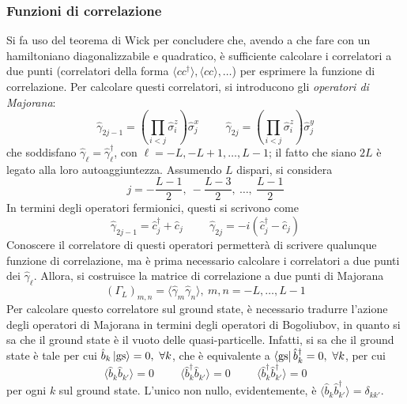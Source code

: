 \documentclass[11pt, a4paper]{scrartcl}
\theoremstyle{style}
\theoremstyle{style1}
\numberwithin{equation}{subsection}
\begin{document}
\subsubsection{Funzioni di correlazione}
Si fa uso del teorema di Wick per concludere che, avendo a che fare con un hamiltoniano diagonalizzabile e quadratico, \`e sufficiente calcolare i correlatori a due punti (correlatori della forma $\langle c c^\dagger  \rangle, \langle c c \rangle,\ldots$) per esprimere la funzione di correlazione.
Per calcolare questi correlatori, si introducono gli \textit{operatori di Majorana}:
\[
\hat{\gamma}_{2j - 1}  = \left(\prod_{i < j} \hat{\sigma }_i ^z\right) \hat{\sigma }_j^x \hspace{1cm} \hat{\gamma}_{2j}  = \left(\prod _{i < j} \hat{\sigma }_i^z\right) \hat{\sigma }_j^y
\] 
che soddisfano $\hat{\gamma}_\ell  = \hat{\gamma}_{\ell } ^\dagger $, con $\ell = -L , - L + 1 ,\ldots, L - 1$; il fatto che siano $2L$ \`e legato alla loro autoaggiuntezza.
Assumendo $L$ dispari, si considera 
\[
j = - \frac{L-1}{2} , \ - \frac{L-3}{2}, \ \ldots,\ \frac{L-1}{2} 
\] 
In termini degli operatori fermionici, questi si scrivono come 
\begin{equation}\label{mdef}
\hat{\gamma}_{2j - 1}  = \hat{c}^\dagger _j + \hat{c}_j \hspace{1cm} \hat{\gamma}_{2j}  = -i \left(\hat{c}^\dagger _j - \hat{c}_j\right) 
\end{equation}
Conoscere il correlatore di questi operatori permetter\`a di scrivere qualunque funzione di correlazione, ma \`e prima necessario calcolare i correlatori a due punti dei $\hat{\gamma}_\ell $. 
Allora, si costruisce la matrice di correlazione a due punti di Majorana
\[
	(\Gamma_L)_{m,n} = \langle \hat{\gamma}_ m \hat{\gamma}_n \rangle  , \ m,n = - L ,\ldots, L -1 
\] 
Per calcolare questo correlatore sul ground state, \`e necessario tradurre l'azione degli operatori di Majorana in termini degli operatori di Bogoliubov, in quanto si sa che il ground state \`e il vuoto delle quasi-particelle.
Infatti, si sa che il ground state \`e tale per cui $\hat{b}_k \ket{\text{gs}} = 0 , \ \forall k$, che \`e equivalente a $\bra{\text{gs}} \hat{b}^\dagger _k=0, \ \forall k$, per cui
\[
\langle \hat{b}_k \hat{b}_{k'}  \rangle= 0 \hspace{1cm} \langle \hat{b}^\dagger _k \hat{b}_{k'}  \rangle = 0 \hspace{1cm} \langle \hat{b}^\dagger _k \hat{b}^\dagger _{k'}  \rangle= 0
\] 
per ogni $k$ sul ground state.
L'unico non nullo, evidentemente, \`e $\langle \hat{b}_k \hat{b}_{k'}^\dagger  \rangle = \delta _{k k'} $.
\end{document}
